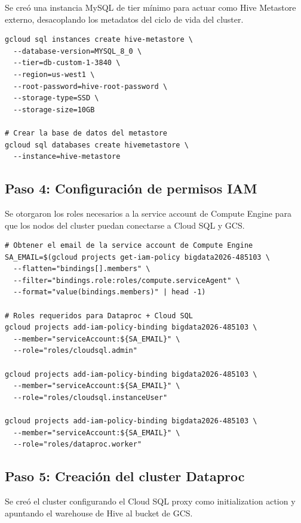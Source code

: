 \documentclass[12pt, letterpaper]{article}
\begin{document}
Se creó una instancia MySQL de tier mínimo para actuar como Hive Metastore externo, desacoplando los metadatos del ciclo de vida del cluster.

\begin{lstlisting}[style=codestyle, caption={Creación de la instancia Cloud SQL para Hive Metastore}]
gcloud sql instances create hive-metastore \
  --database-version=MYSQL_8_0 \
  --tier=db-custom-1-3840 \
  --region=us-west1 \
  --root-password=hive-root-password \
  --storage-type=SSD \
  --storage-size=10GB

# Crear la base de datos del metastore
gcloud sql databases create hivemetastore \
  --instance=hive-metastore
\end{lstlisting}

\subsection{Paso 4: Configuración de permisos IAM}

Se otorgaron los roles necesarios a la service account de Compute Engine para que los nodos del cluster puedan conectarse a Cloud SQL y GCS.

\begin{lstlisting}[style=codestyle, caption={Asignación de roles IAM a la service account de Compute Engine}]
# Obtener el email de la service account de Compute Engine
SA_EMAIL=$(gcloud projects get-iam-policy bigdata2026-485103 \
  --flatten="bindings[].members" \
  --filter="bindings.role:roles/compute.serviceAgent" \
  --format="value(bindings.members)" | head -1)

# Roles requeridos para Dataproc + Cloud SQL
gcloud projects add-iam-policy-binding bigdata2026-485103 \
  --member="serviceAccount:${SA_EMAIL}" \
  --role="roles/cloudsql.admin"

gcloud projects add-iam-policy-binding bigdata2026-485103 \
  --member="serviceAccount:${SA_EMAIL}" \
  --role="roles/cloudsql.instanceUser"

gcloud projects add-iam-policy-binding bigdata2026-485103 \
  --member="serviceAccount:${SA_EMAIL}" \
  --role="roles/dataproc.worker"
\end{lstlisting}

\subsection{Paso 5: Creación del cluster Dataproc}

Se creó el cluster configurando el Cloud SQL proxy como initialization action y apuntando el warehouse de Hive al bucket de GCS.
\end{document}
